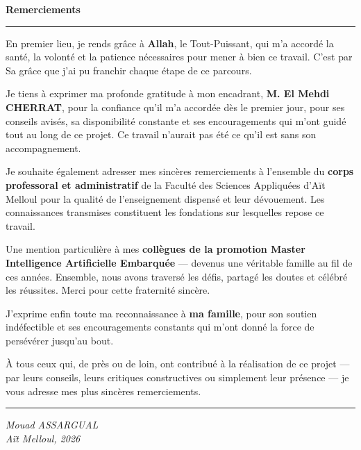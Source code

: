 
\newpage
\thispagestyle{empty}

\begin{center}
{\Large\bfseries\color{PrimaryBlue} Remerciements}
\end{center}

\vspace{0.5cm}
\rule{\linewidth}{0.4pt}
\vspace{0.5cm}

{\normalsize

En premier lieu, je rends grâce à \textbf{Allah}, le
Tout-Puissant, qui m'a accordé la santé, la volonté et
la patience nécessaires pour mener à bien ce travail.
C'est par Sa grâce que j'ai pu franchir chaque étape
de ce parcours.

\vspace{0.3cm}

Je tiens à exprimer ma profonde gratitude à mon encadrant,
\textbf{M. El Mehdi CHERRAT}, pour la confiance qu'il
m'a accordée dès le premier jour, pour ses conseils avisés,
sa disponibilité constante et ses encouragements qui m'ont
guidé tout au long de ce projet. Ce travail n'aurait pas
été ce qu'il est sans son accompagnement.

\vspace{0.3cm}

Je souhaite également adresser mes sincères remerciements
à l'ensemble du \textbf{corps professoral et administratif}
de la Faculté des Sciences Appliquées d'Aït Melloul pour
la qualité de l'enseignement dispensé et leur dévouement.
Les connaissances transmises constituent les fondations
sur lesquelles repose ce travail.

\vspace{0.3cm}

Une mention particulière à mes \textbf{collègues de la
promotion Master Intelligence Artificielle Embarquée} —
devenus une véritable famille au fil de ces années.
Ensemble, nous avons traversé les défis, partagé les
doutes et célébré les réussites. Merci pour cette
fraternité sincère.

\vspace{0.3cm}

J'exprime enfin toute ma reconnaissance à \textbf{ma
famille}, pour son soutien indéfectible et ses
encouragements constants qui m'ont donné la force
de persévérer jusqu'au bout.

\vspace{0.3cm}

À tous ceux qui, de près ou de loin, ont contribué
à la réalisation de ce projet — par leurs conseils,
leurs critiques constructives ou simplement leur
présence — je vous adresse mes plus sincères
remerciements.

}

\vspace{0.3cm}
\rule{\linewidth}{0.4pt}

\begin{flushright}
{\normalsize\textit{Mouad ASSARGUAL}}\\
{\small\textit{Aït Melloul, 2026}}
\end{flushright}